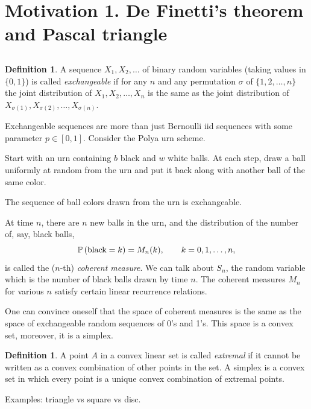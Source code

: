 \documentclass[letterpaper,11pt,oneside,reqno]{article}
\numberwithin{equation}{section}
\theoremstyle{definition}
\newtheorem{definition}[proposition]{Definition}
\begin{document}
\section{Motivation 1. De Finetti's theorem and Pascal triangle}

\subsection{}

\begin{definition}
	A sequence $X_1,X_2,\ldots $
	of binary random variables
	(taking values in $\{0,1\}$)
	is called \emph{exchangeable}
	if for any $n$ and any permutation $\sigma$ of $\{1,2,\ldots,n\}$ the joint distribution of $X_1,X_2,\ldots,X_n$ is the same as the joint distribution of $X_{\sigma(1)},X_{\sigma(2)},\ldots,X_{\sigma(n)}$.
\end{definition}

Exchangeable sequences are more than just Bernoulli iid sequences with some
parameter $p\in[0,1]$. Consider the Polya urn scheme.

Start with an urn containing $b$ black and $w$ white balls.
At each step, draw a ball uniformly at random from the urn
and put it back along with another ball of the same color.

The sequence of ball colors drawn from the urn is exchangeable.

At time $n$, there are $n$ new balls in the urn, and the distribution of the number of, say,
black balls,
\begin{equation*}
	\operatorname{\mathbb{P}}\left( \textnormal{black}=k \right) = M_n(k),
	\qquad k=0,1,\ldots,n,
\end{equation*}
is called the ($n$-th) \emph{coherent measure}.
We can talk about $S_n$, the random variable which is the number of black balls drawn by time $n$.
The coherent measures $M_n$ for various $n$ satisfy certain linear
recurrence relations.

One can convince oneself that the space of coherent measures is
the same as the space of exchangeable random sequences of 0's and 1's.
This space is a convex set, moreover, it is a simplex.

\begin{definition}
	A point $A$ in a convex linear set is called
	\emph{extremal} if it cannot be written as a convex combination of other points in the set.
	A simplex is a convex set in which every point is a unique
	convex combination of extremal points.

	Examples: triangle vs square vs disc.
\end{definition}
\end{document}
